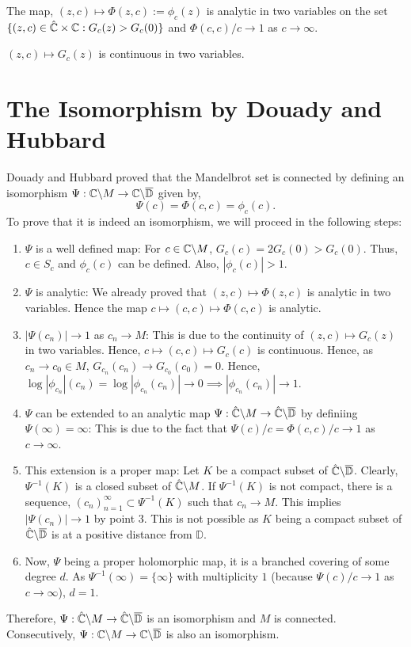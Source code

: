 \begin{theorem}
	The map, \( (z,c)\mapsto \Phi(z,c):= \phi_c(z) \) is analytic in two variables on the set \( \{(z,c)\in \hat{\mathbb{C}}\times \mathbb{C}:G_c(z)>G_c(0)\} \) and \( \Phi(c,c) /c\to 1 \) as \( c\to \infty \).
\end{theorem}

\begin{theorem}
	\( (z,c)\mapsto G_c(z) \) is continuous in two variables.
\end{theorem}


\section{The Isomorphism by Douady and Hubbard}
Douady and Hubbard proved that the Mandelbrot set is connected by defining an isomorphism \( \Psi:\mathbb{C}\backslash M \to \mathbb{C}\backslash \overline{\mathbb{D}}  \) given by, \[
	\Psi(c)=\Phi(c,c)=\phi_c(c)
.\] 
To prove that it is indeed an isomorphism, we will proceed in the following steps:
\begin{enumerate}
	\item \( \Psi \) is a well defined map: For \( c\in \mathbb{C}\backslash M \), \( G_c(c)=2G_c(0)>G_c(0) \). Thus, \( c\in S_c \) and \( \phi_c(c) \) can be defined. Also, \( |\phi_c(c)|>1 \).
	\item \( \Psi \) is analytic: We already proved that \( (z,c)\mapsto \Phi(z,c) \) is analytic in two
		variables. Hence the map \( c\mapsto (c,c)\mapsto \Phi(c,c) \) is analytic.
	\item \( |\Psi(c_n)|\to 1 \) as \( c_n\to M \): This is due to the continuity of \( (z,c)\mapsto G_c(z) \) in two variables. Hence, \( c\mapsto (c,c)\mapsto G_c(c) \) is continuous. Hence, as \( c_n\to c_0\in M \), \( G_{c_n}(c_n)\to G_{c_0}(c_0)=0 \). Hence, \( \log |\phi_{c_n}|(c_n) = \log |\phi_{c_n}(c_n)|\to 0\implies|\phi_{c_n}(c_n)|\to 1  \).
	\item \( \Psi \) can be extended to an analytic map \( \Psi:\hat{\mathbb{C}}\backslash M\to \hat{\mathbb{C}}\backslash \overline{\mathbb{D}}  \) by definiing \( \Psi(\infty)=\infty \): This is due to the fact that \( \Psi(c) /c=\Phi(c,c) /c\to 1 \) as \( c\to \infty \).
	\item This extension is a proper map: Let \( K \) be a compact subset of \( \hat{\mathbb{C}}\backslash \overline{\mathbb{D}}  \). Clearly, \( \Psi^{-1}(K) \) is a closed subset of \( \hat{\mathbb{C}}\backslash M \). If \( \Psi^{-1}(K) \) is not compact, there is a sequence, \( (c_n)_{n=1}^\infty\subset \Psi^{-1}(K) \) such that \( c_n\to M \). This implies \( |\Psi(c_n)|\to 1 \) by point 3. This is not possible as \( K \) being a compact subset of \( \hat{\mathbb{C}}\backslash\overline{\mathbb{D}} \) is at a positive distance from \( \mathbb{D} \).
	\item Now, \( \Psi \) being a proper holomorphic map, it is a branched covering of some degree \( d \).
		As \( \Psi^{-1}(\infty)=\{\infty\} \) with multiplicity \( 1 \) (because \( \Psi(c) /c\to 1 \)
		as \( c\to \infty \)), \( d=1 \).
\end{enumerate}
Therefore, \( \Psi:\hat{\mathbb{C}}\backslash M\to \hat{\mathbb{C}}\backslash \overline{\mathbb{D}}  \) is an isomorphism and \( M \)
is connected. Consecutively, \( \Psi:\mathbb{C}\backslash M\to \mathbb{C}\backslash \overline{\mathbb{D}}  \) is 
also an isomorphism.
